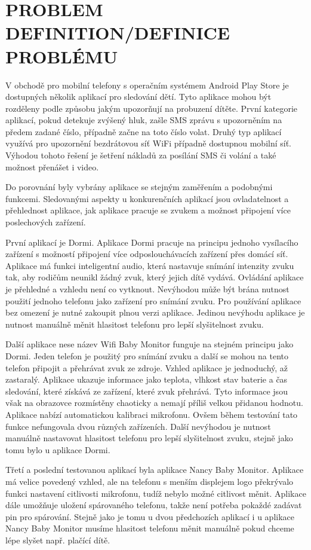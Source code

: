 \documentclass[journal, a4paper]{IEEEtran}
\begin{document}
\section{PROBLEM DEFINITION/DEFINICE PROBLÉMU}
V obchodě pro mobilní telefony s operačním systémem Android Play Store je dostupných několik aplikací pro sledování dětí. Tyto aplikace mohou být rozděleny podle způsobu jakým upozorňují na probuzení dítěte. První kategorie aplikací, pokud detekuje zvýšený hluk, zašle SMS zprávu s upozorněním na předem zadané číslo, případně začne na toto číslo volat. Druhý typ aplikací využívá pro upozornění bezdrátovou síť WiFi případně dostupnou mobilní síť. Výhodou tohoto řešení je šetření nákladů za posílání SMS či volání a také možnost přenášet i video. \par
Do porovnání byly vybrány aplikace se stejným zaměřením a podobnými funkcemi. Sledovanými aspekty u konkurenčních aplikací jsou ovladatelnost a přehlednost aplikace, jak aplikace pracuje se zvukem a možnost připojení více poslechových zařízení. \par
První aplikací je Dormi. Aplikace Dormi pracuje na principu jednoho vysílacího zařízení s možností připojení více odposlouchávacích zařízení přes domácí síť. Aplikace má funkci inteligentní audio, která nastavuje snímání intenzity zvuku tak, aby rodičům neunikl žádný zvuk, který jejich dítě vydává. Ovládání aplikace je přehledné a vzhledu není co vytknout. Nevýhodou může být brána nutnost použití jednoho telefonu jako zařízení pro snímání zvuku. Pro používání aplikace bez omezení je nutné zakoupit plnou verzi aplikace. Jedinou nevýhodu aplikace je nutnost manuálně měnit hlasitost telefonu pro lepší slyšitelnost zvuku. \par
Další aplikace nese název Wifi Baby Monitor funguje na stejném principu jako Dormi. Jeden telefon je použitý pro snímání zvuku a další se mohou na tento telefon připojit a přehrávat zvuk ze zdroje. Vzhled aplikace je jednoduchý, až zastaralý. Aplikace ukazuje informace jako teplota, vlhkost stav baterie a čas sledování, které získává ze zařízení, které zvuk přehrává. Tyto informace jsou však na obrazovce rozmístěny chaoticky a nemají příliš velkou přidanou hodnotu. Aplikace nabízí automatickou kalibraci mikrofonu. Ovšem během testování tato funkce nefungovala dvou různých zařízeních. Další nevýhodou je nutnost manuálně nastavovat hlasitost telefonu pro lepší slyšitelnost zvuku, stejně jako tomu bylo u aplikace Dormi. \par
Třetí a poslední testovanou aplikací byla aplikace Nancy Baby Monitor. Aplikace má velice povedený vzhled, ale na telefonu s menším displejem logo překrývalo funkci nastavení citlivosti mikrofonu, tudíž nebylo možné citlivost měnit. Aplikace dále umožňuje uložení spárovaného telefonu, takže není potřeba pokaždé zadávat pin pro spárování. Stejně jako je tomu u dvou předchozích aplikací i u aplikace Nancy Baby Monitor musíme hlasitost telefonu měnit manuálně pokud chceme lépe slyšet např. plačící dítě. \par
\end{document}

